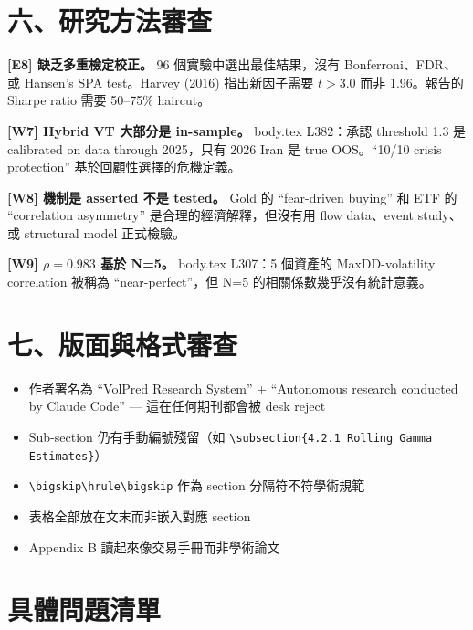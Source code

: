 \documentclass[12pt,a4paper]{article}
\begin{document}
\section*{六、研究方法審查}

\textcolor{errorred}{\textbf{[E8] 缺乏多重檢定校正。}} 96 個實驗中選出最佳結果，沒有 Bonferroni、FDR、或 Hansen's SPA test。Harvey (2016) 指出新因子需要 $t > 3.0$ 而非 1.96。報告的 Sharpe ratio 需要 50--75\% haircut。

\textcolor{warncolor}{\textbf{[W7] Hybrid VT 大部分是 in-sample。}} body.tex L382：承認 threshold 1.3 是 calibrated on data through 2025，只有 2026 Iran 是 true OOS。``10/10 crisis protection'' 基於回顧性選擇的危機定義。

\textcolor{warncolor}{\textbf{[W8] 機制是 asserted 不是 tested。}} Gold 的 ``fear-driven buying'' 和 ETF 的 ``correlation asymmetry'' 是合理的經濟解釋，但沒有用 flow data、event study、或 structural model 正式檢驗。

\textcolor{warncolor}{\textbf{[W9] $\rho = 0.983$ 基於 N=5。}} body.tex L307：5 個資產的 MaxDD-volatility correlation 被稱為 ``near-perfect''，但 N=5 的相關係數幾乎沒有統計意義。

\section*{七、版面與格式審查}

\begin{itemize}[nosep]
\item 作者署名為 ``VolPred Research System'' + ``Autonomous research conducted by Claude Code'' — 這在任何期刊都會被 desk reject
\item Sub-section 仍有手動編號殘留（如 \verb|\subsection{4.2.1 Rolling Gamma Estimates}|）
\item \verb|\bigskip\hrule\bigskip| 作為 section 分隔符不符學術規範
\item 表格全部放在文末而非嵌入對應 section
\item Appendix B 讀起來像交易手冊而非學術論文
\end{itemize}

\section*{具體問題清單}
\end{document}
